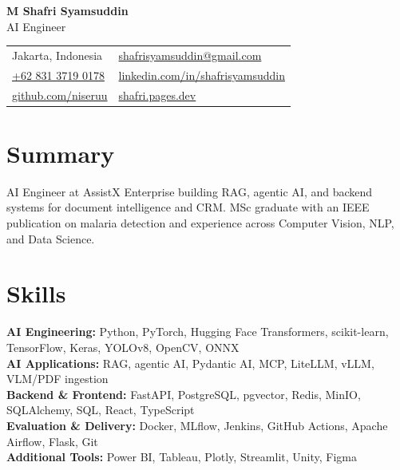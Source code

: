 \documentclass[10pt,a4paper]{article}
\begin{document}
{\LARGE \textbf{M Shafri Syamsuddin}}\\[2pt]
{\large AI Engineer}\\[4pt]
\begin{tabularx}{\textwidth}{@{}X X@{}}
Jakarta, Indonesia & \href{mailto:shafrisyamsuddin@gmail.com}{shafrisyamsuddin@gmail.com}\\
\href{tel:+6283137190178}{+62 831 3719 0178} & \href{https://www.linkedin.com/in/shafrisyamsuddin/}{linkedin.com/in/shafrisyamsuddin} \\
\href{https://github.com/niseruu}{github.com/niseruu} &
\href{https://shafri.pages.dev}{shafri.pages.dev}\\
\end{tabularx}

\section*{Summary}
AI Engineer at AssistX Enterprise building RAG, agentic AI, and backend systems for document intelligence and CRM. MSc graduate with an IEEE publication on malaria detection and experience across Computer Vision, NLP, and Data Science.

\section*{Skills}
\textbf{AI Engineering:} Python, PyTorch, Hugging Face Transformers, scikit-learn, TensorFlow, Keras, YOLOv8, OpenCV, ONNX\\
\textbf{AI Applications:} RAG, agentic AI, Pydantic AI, MCP, LiteLLM, vLLM, VLM/PDF ingestion\\
\textbf{Backend \& Frontend:} FastAPI, PostgreSQL, pgvector, Redis, MinIO, SQLAlchemy, SQL, React, TypeScript\\
\textbf{Evaluation \& Delivery:} Docker, MLflow, Jenkins, GitHub Actions, Apache Airflow, Flask, Git\\
\textbf{Additional Tools:} Power BI, Tableau, Plotly, Streamlit, Unity, Figma
\end{document}
